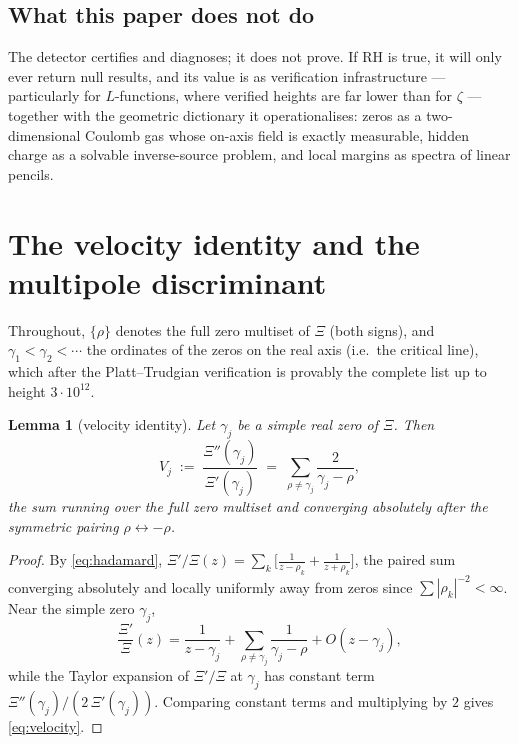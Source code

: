 \documentclass[11pt]{amsart}
\newtheorem{lemma}[theorem]{Lemma}
\theoremstyle{remark}
\begin{document}
\subsection{What this paper does not do}
The detector certifies and diagnoses; it does not prove. If RH is true, it will only ever return null results, and its value is as verification infrastructure --- particularly for $L$-functions, where verified heights are far lower than for $\zeta$ --- together with the geometric dictionary it operationalises: zeros as a two-dimensional Coulomb gas whose on-axis field is exactly measurable, hidden charge as a solvable inverse-source problem, and local margins as spectra of linear pencils.

\section{The velocity identity and the multipole discriminant}\label{sec:detector}

Throughout, $\{\rho\}$ denotes the full zero multiset of $\Xi$ (both signs), and $\gamma_1<\gamma_2<\cdots$ the ordinates of the zeros on the real axis (i.e.\ the critical line), which after the Platt--Trudgian verification \cite{PT} is provably the complete list up to height $3\cdot 10^{12}$.

\begin{lemma}[velocity identity]\label{lem:velocity}
Let $\gamma_j$ be a simple real zero of\/ $\Xi$. Then
\begin{equation}\label{eq:velocity}
V_j \;:=\; \frac{\Xi''(\gamma_j)}{\Xi'(\gamma_j)}
\;=\; \sum_{\rho\ne\gamma_j}\frac{2}{\gamma_j-\rho},
\end{equation}
the sum running over the full zero multiset and converging absolutely after the symmetric pairing $\rho\leftrightarrow-\rho$.
\end{lemma}

\begin{proof}
By \eqref{eq:hadamard}, $\Xi'/\Xi(z)=\sum_k \bigl[\tfrac{1}{z-\rho_k}+\tfrac{1}{z+\rho_k}\bigr]$, the paired sum converging absolutely and locally uniformly away from zeros since $\sum|\rho_k|^{-2}<\infty$. Near the simple zero $\gamma_j$,
\[
\frac{\Xi'}{\Xi}(z)=\frac{1}{z-\gamma_j}+\!\!\sum_{\rho\ne\gamma_j}\frac{1}{\gamma_j-\rho}+O(z-\gamma_j),
\]
while the Taylor expansion of $\Xi'/\Xi$ at $\gamma_j$ has constant term $\Xi''(\gamma_j)/(2\,\Xi'(\gamma_j))$. Comparing constant terms and multiplying by $2$ gives \eqref{eq:velocity}.
\end{proof}
\end{document}
